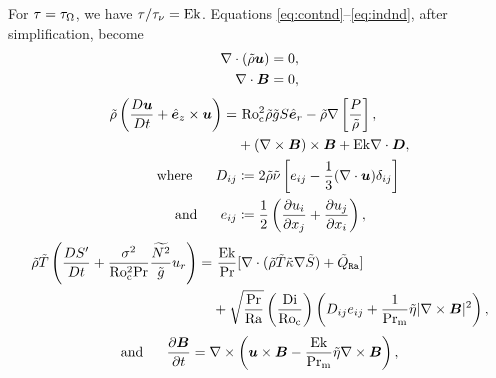 \documentclass[12pt]{article}
\numberwithin{equation}{section}
\begin{document}
For $\tau=\tau_\Omega$, we have $\tau/\tau_{\nu}={\rm{Ek}}$. Equations \eqref{eq:contnd}--\eqref{eq:indnd}, after simplification, become
\begin{align}
	\nabla\cdot(\tilde{\rho}\bm{u}) &= 0\label{eq:contndrot},\\
	\nabla\cdot \bm{B} &= 0,
\end{align}
\begin{subequations}\label{eq:momndrot}
	\begin{align}
		\rhotilde\left(\matderiv{\vecu} + \ez\times\vecu\right) = &\ \rocsq \rhotilde\gtilde S\er         -\rhotilde\nabla\left[ \frac{P}{\rhotilde} \right], \nonumber\\
		&+(\curl\vecb)\times\vecb + \ek \Div\bm{D},\\
		\where D_{ij} &\define 2\rhotilde\nutilde \left[e_{ij} - \frac{1}{3}(\Div\vecu) \delta_{ij} \right]\\
		\andd e_{ij} &\define \frac{1}{2}\left(\pderiv{u_i}{x_j} + \pderiv{u_j}{x_i} \right),
	\end{align}
\end{subequations}
\begin{align}\label{eq:enndrot}
	\tilde{\rho}\tilde{T}\left( \frac{D{S^\prime}}{Dt}+ \frac{\sigma^2}{{\rm{Ro_c^2}}{\rm{Pr}}} \frac{\widetilde{N^2}}{\tilde{g}} u_r\right)  = &\ \frac{{\rm{Ek}}}{{\rm{Pr}}} [\nabla\cdot(\tilde{\rho} \tilde{T} \tilde{\kappa} \nabla \tilde{S}) + \tilde{Q}_{\texttt{Ra}}] \nonumber \\
	&+ \sqrt{\frac{{\rm{Pr}}}{{\rm{Ra}}}}\left(\frac{{\rm{Di}}}{{\rm{Ro_c}}}\right) \left( D_{ij}e_{ij} + \frac{1}{{\rm{Pr_m}}} \tilde{\eta}|\nabla\times\bm{B}|^2\right),
\end{align}
\begin{align}\label{eq:indndrot}
	\text{and}\ \ \ \ \  \frac{\partial\bm{B}}{\partial t} = \nabla\times\left(\bm{u}\times\bm{B} - \frac{{\rm{Ek}}}{{\rm{Pr_m}}} \tilde{\eta}\nabla\times\bm{B}\right),
\end{align}	
\end{document}
